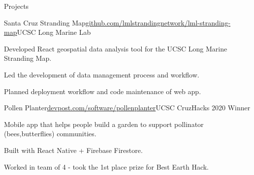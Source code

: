 \documentclass{resume} %
\begin{document}

\begin{rSection}{Projects}
    \begin{rSubsection}{Santa Cruz Stranding Map}{\href{https://github.com/lmlstrandingnetwork/lml-stranding-map}{github.com/lmlstrandingnetwork/lml-stranding-map}}{UCSC Long Marine Lab}{}
        \item Developed React geospatial data analysis tool for the UCSC Long Marine Stranding Map.
        \item Led the development of data management process and workflow.
        \item Planned deployment workflow and code maintenance of web app.
    \end{rSubsection}

    \begin{rSubsection}{Pollen Planter}{\href{https://www.devpost.com/software/pollenplanter}{devpost.com/software/pollenplanter}}{UCSC CruzHacks 2020 Winner}{}
        \item Mobile app that helps people build a garden to support pollinator (bees,butterflies) communities.
        \item Built with React Native + Firebase Firestore.
        \item Worked in team of 4 - took the 1st place prize for Best Earth Hack.
    \end{rSubsection}
\end{rSection}





\end{document}
